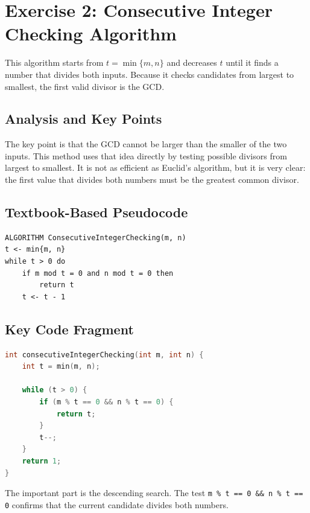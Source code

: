 \documentclass[12pt,a4paper]{article}
\begin{document}
\section{Exercise 2: Consecutive Integer Checking Algorithm}

This algorithm starts from $t=\min\{m,n\}$ and decreases $t$ until it finds a number that divides both inputs. Because it checks candidates from largest to smallest, the first valid divisor is the GCD.

\subsection*{Analysis and Key Points}

The key point is that the GCD cannot be larger than the smaller of the two inputs. This method uses that idea directly by testing possible divisors from largest to smallest. It is not as efficient as Euclid's algorithm, but it is very clear: the first value that divides both numbers must be the greatest common divisor.

\subsection*{Textbook-Based Pseudocode}

\begin{lstlisting}
ALGORITHM ConsecutiveIntegerChecking(m, n)
t <- min{m, n}
while t > 0 do
    if m mod t = 0 and n mod t = 0 then
        return t
    t <- t - 1
\end{lstlisting}

\subsection*{Key Code Fragment}

\begin{lstlisting}[language=C]
int consecutiveIntegerChecking(int m, int n) {
    int t = min(m, n);

    while (t > 0) {
        if (m % t == 0 && n % t == 0) {
            return t;
        }
        t--;
    }
    return 1;
}
\end{lstlisting}

The important part is the descending search. The test \texttt{m \% t == 0 \&\& n \% t == 0} confirms that the current candidate divides both numbers.
\end{document}
